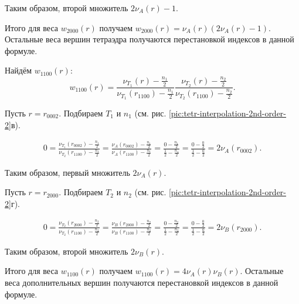 Таким образом, второй множитель $2\nu_{A}(r)-1$.

Итого для веса $w_{2000}(r)$ получаем $w_{2000}(r) = \nu_{A}(r) (2\nu_{A}(r)-1)$. Остальные веса вершин тетраэдра получаются перестановкой индексов в данной формуле.

Найдём $w_{1100}(r)$:
\begin{equation}
w_{1100}(r) = \frac{ \nu_{T_1}(r) - \frac{n_1}{2} }{ \nu_{T_1}(r_{1100}) - \frac{n_1}{2} } \frac{ \nu_{T_2}(r) - \frac{n_2}{2} }{ \nu_{T_2}(r_{1100}) - \frac{n_2}{2} }.
\end{equation}

Пусть $r = r_{0002}$. Подбираем $T_1$ и $n_1$ (см. рис. \ref{pic:tetr-interpolation-2nd-order-2}в).

\begin{eqnarray}
0 = \frac{ \nu_{T_1}(r_{0002}) - \frac{n_1}{2} }{ \nu_{T_2}(r_{1100}) - \frac{n_1}{2} } = \frac{ \nu_{A}(r_{0002}) - \frac{n_1}{2} }{ \nu_{A}(r_{1100}) - \frac{n_1}{2} } = \frac{ 0 - \frac{n_1}{2} }{ \frac{1}{2} - \frac{n_1}{2} } = \frac{ 0 - \frac{0}{2} }{ \frac{1}{2} - \frac{0}{2} } = 2\nu_{A}(r_{0002}).
\end{eqnarray}

Таким образом, первый множитель $2\nu_{A}(r)$.

Пусть $r = r_{2000}$. Подбираем $T_2$ и $n_2$ (см. рис. \ref{pic:tetr-interpolation-2nd-order-2}г).

\begin{eqnarray}
0 = \frac{ \nu_{T_2}(r_{2000}) - \frac{n_2}{2} }{ \nu_{T_2}(r_{1100}) - \frac{n_2}{2} } = \frac{ \nu_{B}(r_{2000}) - \frac{n_2}{2} }{ \nu_{B}(r_{1100}) - \frac{n_2}{2} } = \frac{ 0 - \frac{n_2}{2} }{ \frac{1}{2} - \frac{n_2}{2} } = \frac{ 0 - \frac{0}{2} }{ \frac{1}{2} - \frac{0}{2} } = 2\nu_{B}(r_{2000}).
\end{eqnarray}

Таким образом, второй множитель $2\nu_{B}(r)$.

Итого для веса $w_{1100}(r)$ получаем $w_{1100}(r) = 4 \nu_{A}(r) \nu_{B}(r)$. Остальные веса дополнительных вершин получаются перестановкой индексов в данной формуле.



